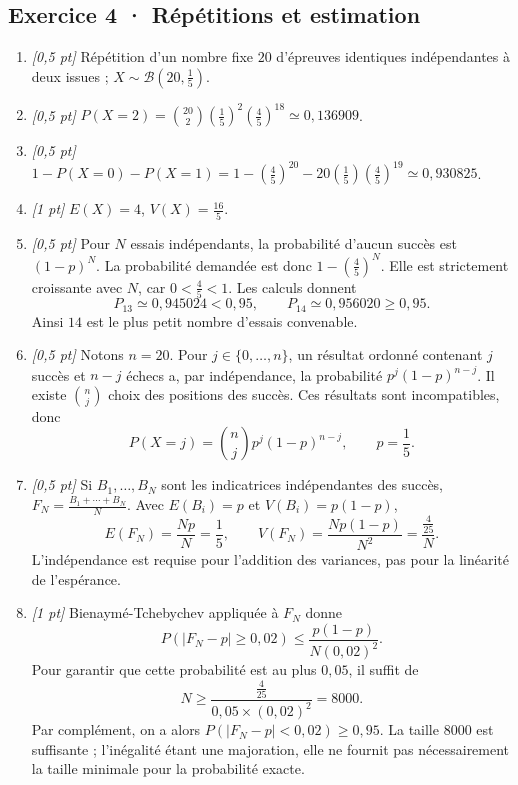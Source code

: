 \subsection*{Exercice 4 · Répétitions et estimation}\begin{enumerate}

\item \textit{[0,5 pt]} Répétition d'un nombre fixe $20$ d'épreuves identiques indépendantes à deux issues ; $X\sim\mathcal B(20,\frac{1}{5})$.

\item \textit{[0,5 pt]} $P(X=2)=\binom{20}2(\frac{1}{5})^2(\frac{4}{5})^{18}\simeq0{,}136909$.

\item \textit{[0,5 pt]} $1-P(X=0)-P(X=1)=1-(\frac{4}{5})^{20}-20(\frac{1}{5})(\frac{4}{5})^{19}\simeq0{,}930825$.

\item \textit{[1 pt]} $E(X)=4$, $V(X)=\frac{16}{5}$.

\item \textit{[0,5 pt]} Pour $N$ essais indépendants, la probabilité d'aucun succès est $(1-p)^N$. La probabilité demandée est donc $1-(\frac{4}{5})^N$. Elle est strictement croissante avec $N$, car $0<\frac{4}{5}<1$. Les calculs donnent
\[P_{13}\simeq0{,}945024<0{,}95,\qquad P_{14}\simeq0{,}956020\ge0{,}95.\]
Ainsi $14$ est le plus petit nombre d'essais convenable.

\item \textit{[0,5 pt]} Notons $n=20$. Pour $j\in\{0,\ldots,n\}$, un résultat ordonné contenant $j$ succès et $n-j$ échecs a, par indépendance, la probabilité $p^j(1-p)^{n-j}$. Il existe $\binom nj$ choix des positions des succès. Ces résultats sont incompatibles, donc
\[P(X=j)=\binom nj p^j(1-p)^{n-j},\qquad p=\frac{1}{5}.\]

\item \textit{[0,5 pt]} Si $B_1,\ldots,B_N$ sont les indicatrices indépendantes des succès, $F_N=\frac{B_1+\cdots+B_N}{N}$. Avec $E(B_i)=p$ et $V(B_i)=p(1-p)$,
\[E(F_N)=\frac{Np}{N}=\frac{1}{5},\qquad V(F_N)=\frac{Np(1-p)}{N^2}=\frac{\frac{4}{25}}{N}.\]
L'indépendance est requise pour l'addition des variances, pas pour la linéarité de l'espérance.

\item \textit{[1 pt]} Bienaymé-Tchebychev appliquée à $F_N$ donne
\[P(|F_N-p|\ge0{,}02)\le\frac{p(1-p)}{N(0{,}02)^2}.\]
Pour garantir que cette probabilité est au plus $0{,}05$, il suffit de
\[N\ge\frac{\frac{4}{25}}{0{,}05\times(0{,}02)^2}=8000.\]
Par complément, on a alors $P(|F_N-p|<0{,}02)\ge0{,}95$. La taille $8000$ est suffisante ; l'inégalité étant une majoration, elle ne fournit pas nécessairement la taille minimale pour la probabilité exacte.

\end{enumerate}

